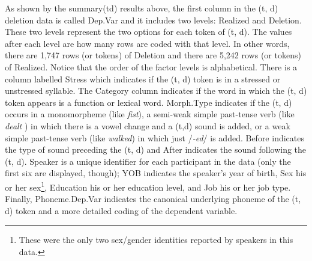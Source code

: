 \documentclass[
  10pt,
  letterpaper]{article}
\renewcommand\texttt[1]{{\ttfamily\color{BrickRed}#1}}
\begin{document}
As shown by the \texttt{summary(td)} results above, the first column in
the (t, d) deletion data is called \texttt{Dep.Var} and it includes two
levels: \texttt{Realized} and \texttt{Deletion}. These two levels
represent the two options for each token of (t, d). The values after
each level are how many rows are coded with that level. In other words,
there are 1,747 rows (or tokens) of \texttt{Deletion} and there are
5,242 rows (or tokens) of \texttt{Realized}. Notice that the order of
the factor levels is alphabetical. There is a column labelled
\texttt{Stress} which indicates if the (t, d) token is in a stressed or
unstressed syllable. The \texttt{Category} column indicates if the word
in which the (t, d) token appears is a function or lexical word.
\texttt{Morph.Type} indicates if the (t, d) occurs in a monomorpheme
(like \emph{fist}), a semi-weak simple past-tense verb (like
\emph{dealt} ) in which there is a vowel change and a (t,d) sound is
added, or a weak simple past-tense verb (like \emph{walked}) in which
just /\emph{-ed}/ is added. \texttt{Before} indicates the type of sound
preceding the (t, d) and \texttt{After} indicates the sound following
the (t, d). \texttt{Speaker} is a unique identifier for each participant
in the data (only the first six are displayed, though); \texttt{YOB}
indicates the speaker's year of birth, \texttt{Sex} his or her
sex\footnote{These were the only two sex/gender identities reported by
  speakers in this data.}, \texttt{Education} his or her education
level, and \texttt{Job} his or her job type. Finally,
\texttt{Phoneme.Dep.Var} indicates the canonical underlying phoneme of
the (t, d) token and a more detailed coding of the dependent variable.
\end{document}
